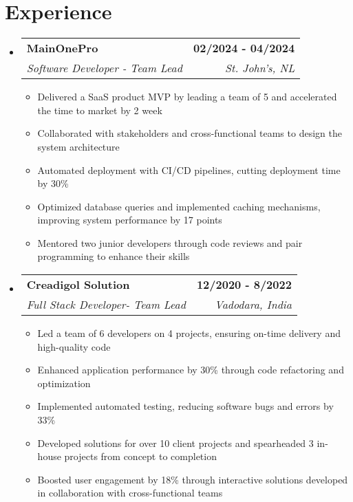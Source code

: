 \documentclass[letterpaper,11pt]{article}
\makeatletter
\newcommand{\resumeItem}[1]{
  \item\small{
    {#1 \vspace{-2pt}}
  }
}
\newcommand{\resumeSubheading}[4]{
  \vspace{-2pt}\item
    \begin{tabular*}{1.0\textwidth}[t]{l@{\extracolsep{\fill}}r}
      \textbf{#1} & \textbf{\small #2} \\
      \textit{\small#3} & \textit{\small #4} \\
    \end{tabular*}\vspace{-7pt}
}
\newcommand{\resumeSubHeadingListStart}{\begin{itemize}[leftmargin=0.0in, label={}]}
\newcommand{\resumeSubHeadingListEnd}{\end{itemize}}
\newcommand{\resumeItemListStart}{\begin{itemize}}
\newcommand{\resumeItemListEnd}{\end{itemize}\vspace{-5pt}}
\makeatother
\begin{document}
\section{Experience}
  \resumeSubHeadingListStart
    \resumeSubheading
      {MainOnePro}{02/2024 - 04/2024}
      {Software Developer - Team Lead}{St. John's, NL}
      \resumeItemListStart
        \resumeItem{Delivered a SaaS product MVP by leading a team of 5 and accelerated the time to market by 2 week}
        \resumeItem{Collaborated with stakeholders and cross-functional teams to design the system architecture}
        \resumeItem{Automated deployment with CI/CD pipelines, cutting deployment time by 30\%}
        \resumeItem{Optimized database queries and implemented caching mechanisms, improving system performance by 17 points}
        \resumeItem{Mentored two junior developers through code reviews and pair programming to enhance their skills}
      \resumeItemListEnd
    \resumeSubheading
      {Creadigol Solution}{12/2020 - 8/2022}
      {Full Stack Developer- Team Lead}{Vadodara, India}
      \resumeItemListStart
        \resumeItem{Led a team of 6 developers on 4 projects, ensuring on-time delivery and high-quality code}
        \resumeItem{Enhanced application performance by 30\% through code refactoring and optimization}
        \resumeItem{Implemented automated testing, reducing software bugs and errors by 33\%}
        \resumeItem{Developed solutions for over 10 client projects and spearheaded 3 in-house projects from concept to completion}
        \resumeItem{Boosted user engagement by 18\% through interactive solutions developed in collaboration with cross-functional teams}
      \resumeItemListEnd
  \resumeSubHeadingListEnd
\vspace{-16pt}
\end{document}
